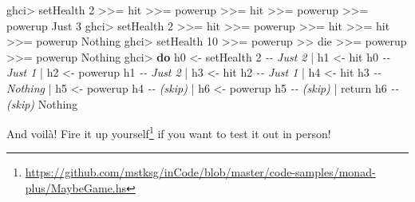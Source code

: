 \documentclass[]{article}
\newenvironment{Shaded}{}{}
\newcommand{\CommentTok}[1]{\textcolor[rgb]{0.38,0.63,0.69}{\textit{#1}}}
\newcommand{\DataTypeTok}[1]{\textcolor[rgb]{0.56,0.13,0.00}{#1}}
\newcommand{\DecValTok}[1]{\textcolor[rgb]{0.25,0.63,0.44}{#1}}
\newcommand{\FunctionTok}[1]{\textcolor[rgb]{0.02,0.16,0.49}{#1}}
\newcommand{\KeywordTok}[1]{\textcolor[rgb]{0.00,0.44,0.13}{\textbf{#1}}}
\newcommand{\NormalTok}[1]{#1}
\newcommand{\OperatorTok}[1]{\textcolor[rgb]{0.40,0.40,0.40}{#1}}
\newcommand{\OtherTok}[1]{\textcolor[rgb]{0.00,0.44,0.13}{#1}}
\renewcommand{\href}[2]{#2\footnote{\url{#1}}}
\begin{document}
\begin{Shaded}
\begin{Highlighting}[]
\NormalTok{ghci}\OperatorTok{\textgreater{}}\NormalTok{ setHealth }\DecValTok{2} \OperatorTok{\textgreater{}\textgreater{}=}\NormalTok{ hit }\OperatorTok{\textgreater{}\textgreater{}=}\NormalTok{ powerup }\OperatorTok{\textgreater{}\textgreater{}=}\NormalTok{ hit }\OperatorTok{\textgreater{}\textgreater{}=}\NormalTok{ powerup }\OperatorTok{\textgreater{}\textgreater{}=}\NormalTok{ powerup}
\DataTypeTok{Just} \DecValTok{3}
\NormalTok{ghci}\OperatorTok{\textgreater{}}\NormalTok{ setHealth }\DecValTok{2} \OperatorTok{\textgreater{}\textgreater{}=}\NormalTok{ hit }\OperatorTok{\textgreater{}\textgreater{}=}\NormalTok{ powerup }\OperatorTok{\textgreater{}\textgreater{}=}\NormalTok{ hit }\OperatorTok{\textgreater{}\textgreater{}=}\NormalTok{ hit }\OperatorTok{\textgreater{}\textgreater{}=}\NormalTok{ powerup}
\DataTypeTok{Nothing}
\NormalTok{ghci}\OperatorTok{\textgreater{}}\NormalTok{ setHealth }\DecValTok{10} \OperatorTok{\textgreater{}\textgreater{}=}\NormalTok{ powerup }\OperatorTok{\textgreater{}\textgreater{}}\NormalTok{ die }\OperatorTok{\textgreater{}\textgreater{}=}\NormalTok{ powerup }\OperatorTok{\textgreater{}\textgreater{}=}\NormalTok{ powerup}
\DataTypeTok{Nothing}
\NormalTok{ghci}\OperatorTok{\textgreater{}} \KeywordTok{do}\NormalTok{  h0 }\OtherTok{\textless{}{-}}\NormalTok{ setHealth }\DecValTok{2}        \CommentTok{{-}{-} Just 2}
    \OperatorTok{|}\NormalTok{     h1 }\OtherTok{\textless{}{-}}\NormalTok{ hit h0             }\CommentTok{{-}{-} Just 1}
    \OperatorTok{|}\NormalTok{     h2 }\OtherTok{\textless{}{-}}\NormalTok{ powerup h1         }\CommentTok{{-}{-} Just 2}
    \OperatorTok{|}\NormalTok{     h3 }\OtherTok{\textless{}{-}}\NormalTok{ hit h2             }\CommentTok{{-}{-} Just 1}
    \OperatorTok{|}\NormalTok{     h4 }\OtherTok{\textless{}{-}}\NormalTok{ hit h3             }\CommentTok{{-}{-} Nothing}
    \OperatorTok{|}\NormalTok{     h5 }\OtherTok{\textless{}{-}}\NormalTok{ powerup h4         }\CommentTok{{-}{-} (skip)}
    \OperatorTok{|}\NormalTok{     h6 }\OtherTok{\textless{}{-}}\NormalTok{ powerup h5         }\CommentTok{{-}{-} (skip)}
    \OperatorTok{|}     \FunctionTok{return}\NormalTok{ h6                }\CommentTok{{-}{-} (skip)}
\DataTypeTok{Nothing}
\end{Highlighting}
\end{Shaded}

And voilà!
\href{https://github.com/mstksg/inCode/blob/master/code-samples/monad-plus/MaybeGame.hs}{Fire
it up yourself} if you want to test it out in person!
\end{document}
